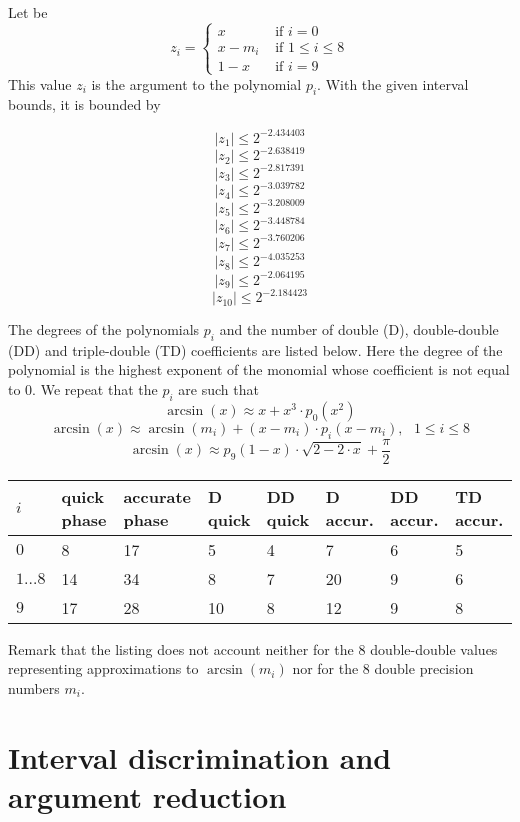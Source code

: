 Let be
$$z_i = \left \lbrace \begin{array}{ll} x & \mbox{ if } i = 0 \\
x - m_i & \mbox{ if } 1 \leq i \leq 8 \\
1 - x & \mbox{ if } i = 9 \end{array} \right.$$
This value $z_i$ is the argument to the polynomial $p_i$. With the given interval bounds, it is bounded by 

$$\left \vert z_1 \right \vert  \leq  2^{-2.434403}$$
$$\left \vert z_2 \right \vert  \leq  2^{-2.638419}$$
$$\left \vert z_3 \right \vert  \leq  2^{-2.817391}$$
$$\left \vert z_4 \right \vert  \leq  2^{-3.039782}$$
$$\left \vert z_5 \right \vert  \leq  2^{-3.208009}$$
$$\left \vert z_6 \right \vert  \leq  2^{-3.448784}$$
$$\left \vert z_7 \right \vert  \leq  2^{-3.760206}$$
$$\left \vert z_8 \right \vert  \leq  2^{-4.035253}$$
$$\left \vert z_9 \right \vert  \leq  2^{-2.064195}$$
$$\left \vert z_{10} \right \vert  \leq  2^{-2.184423}$$

The degrees of the polynomials $p_i$ and the number of double (D),
double-double (DD) and triple-double (TD) coefficients are listed below. Here the degree of the polynomial 
is the highest exponent of the monomial whose coefficient is not equal to $0$. We repeat that the 
$p_i$ are such that
$$\arcsin\left( x \right) \approx x + x^3 \cdot p_0\left( x^2 \right)$$
$$\arcsin\left( x \right) \approx \arcsin\left( m_i \right) + \left(x
- m_i \right) \cdot p_i\left( x - m_i \right), \mbox{~~} 1 \leq i \leq
8$$
$$\arcsin\left( x \right) \approx p_9\left( 1 - x \right) \cdot \sqrt{2 - 2\cdot x} + \frac{\pi}{2}$$

\begin{center}
\begin{tabular}{|l|l|l|l|l|l|l|l|}
\hline
$i$ & quick phase & accurate phase & D quick & DD quick & D accur. & DD accur. & TD accur. \\
\hline
\hline
$0$ & 8 & 17 & 5 & 4 & 7 & 6 & 5 \\ 
\hline
$1\dots8$ & 14 & 34 & 8 & 7 & 20 & 9 & 6 \\ 
\hline
$9$ & 17 & 28 & 10 & 8 & 12 & 9 & 8 \\ 
\hline
\end{tabular}
\end{center}
Remark that the listing does not account neither for the $8$
double-double values representing approximations to $\arcsin\left( m_i
\right)$ nor for the $8$ double precision numbers $m_i$.

\section{Interval discrimination and argument reduction}\label{sec:asinargred}

